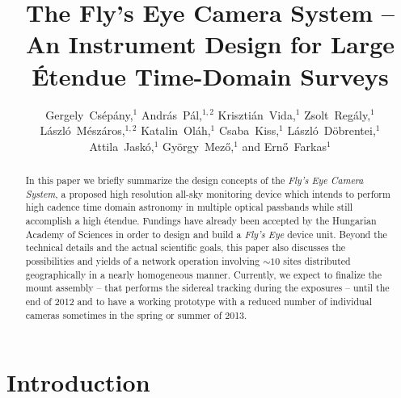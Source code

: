 
\resetcounters




\title{The Fly's Eye Camera System -- An Instrument Design for Large \'Etendue Time-Domain Surveys}
\author{%
Gergely~Cs\'ep\'any,$^{1}$
Andr\'as~P\'al,$^{1,2}$
Kriszti\'an~Vida,$^{1}$
Zsolt~Reg\'aly,$^{1}$
L\'aszl\'o~M\'esz\'aros,$^{1,2}$
Katalin~Ol\'ah,$^{1}$
Csaba~Kiss,$^{1}$
L\'aszl\'o~D\"obrentei,$^{1}$
Attila~Jask\'o,$^{1}$
Gy\"orgy~Mez\H{o},$^{1}$ and
Ern\H{o}~Farkas$^{1}$
}


\begin{abstract}
In this paper we briefly summarize the design concepts of the 
{\it Fly's Eye Camera System}, 
a proposed high resolution all-sky monitoring
device which intends to perform high cadence time domain astronomy
in multiple optical passbands while
still accomplish a high \'etendue. Fundings have already been accepted
by the Hungarian Academy of Sciences
in order to design and build a {\it Fly's Eye} device unit. Beyond the
technical details and the actual scientific goals, this paper
also discusses the possibilities and yields of a network operation
involving $\sim10$ sites distributed geographically in 
a nearly homogeneous manner. Currently, we expect 
to finalize the mount assembly -- that performs the sidereal tracking
during the exposures -- until the end of 2012 and to 
have a working prototype with a reduced number of individual cameras
sometimes in the spring or summer of 2013.
\end{abstract}

\section{Introduction}

